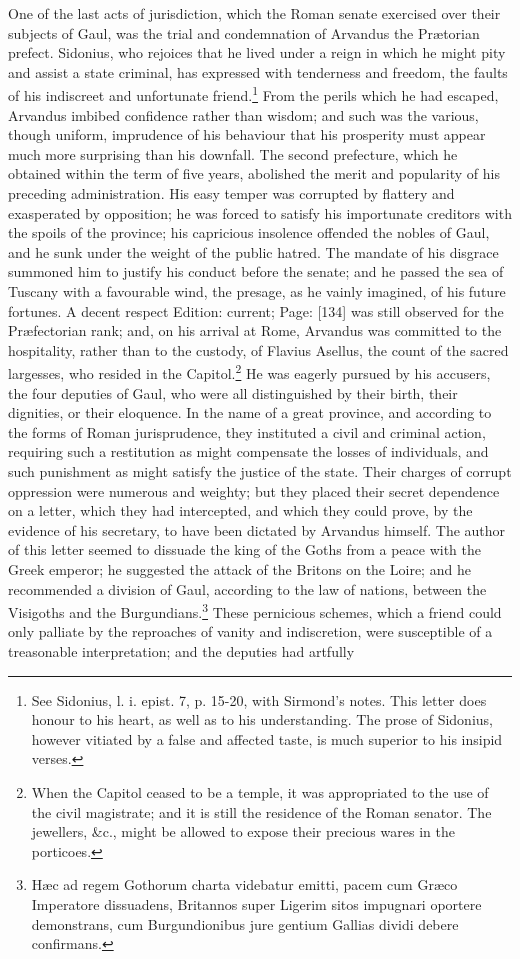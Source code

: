 One of the last acts of jurisdiction, which the Roman senate exercised over their subjects of Gaul, was the trial and condemnation of Arvandus the Prætorian prefect. Sidonius, who rejoices that he lived under a reign in which he might pity and assist a state criminal, has expressed with tenderness and freedom, the faults of his indiscreet and unfortunate friend.\footnote{See Sidonius, l. i. epist. 7, p. 15-20, with Sirmond\texthebrew{}’s notes. This letter does honour to his heart, as well as to his understanding. The prose of Sidonius, however vitiated by a false and affected taste, is much superior to his insipid verses.} From the perils which he had escaped, Arvandus imbibed confidence rather than wisdom; and such was the various, though uniform, imprudence of his behaviour that his prosperity must appear much more surprising than his downfall. The second prefecture, which he obtained within the term of five years, abolished the merit and popularity of his preceding administration. His easy temper was corrupted by flattery and exasperated by opposition; he was forced to satisfy his importunate creditors with the spoils of the province; his capricious insolence offended the nobles of Gaul, and he sunk under the weight of the public hatred. The mandate of his disgrace summoned him to justify his conduct before the senate; and he passed the sea of Tuscany with a favourable wind, the presage, as he vainly imagined, of his future fortunes. A decent respect Edition: current; Page: [134] was still observed for the Præfectorian rank; and, on his arrival at Rome, Arvandus was committed to the hospitality, rather than to the custody, of Flavius Asellus, the count of the sacred largesses, who resided in the Capitol.\footnote{When the Capitol ceased to be a temple, it was appropriated to the use of the civil magistrate; and it is still the residence of the Roman senator. The jewellers, \&c., might be allowed to expose their precious wares in the porticoes.} He was eagerly pursued by his accusers, the four deputies of Gaul, who were all distinguished by their birth, their dignities, or their eloquence. In the name of a great province, and according to the forms of Roman jurisprudence, they instituted a civil and criminal action, requiring such a restitution as might compensate the losses of individuals, and such punishment as might satisfy the justice of the state. Their charges of corrupt oppression were numerous and weighty; but they placed their secret dependence on a letter, which they had intercepted, and which they could prove, by the evidence of his secretary, to have been dictated by Arvandus himself. The author of this letter seemed to dissuade the king of the Goths from a peace with the Greek emperor; he suggested the attack of the Britons on the Loire; and he recommended a division of Gaul, according to the law of nations, between the Visigoths and the Burgundians.\footnote{Hæc ad regem Gothorum charta videbatur emitti, pacem cum Græco Imperatore dissuadens, Britannos super Ligerim sitos impugnari oportere demonstrans, cum Burgundionibus jure gentium Gallias dividi debere confirmans.} These pernicious schemes, which a friend could only palliate by the reproaches of vanity and indiscretion, were susceptible of a treasonable interpretation; and the deputies had artfully 